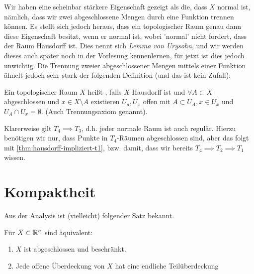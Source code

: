 \begin{remark*}
    Wir haben eine scheinbar stärkere Eigenschaft gezeigt als die, dass $X$ normal ist, nämlich, dass wir zwei abgeschlossene Mengen durch eine Funktion trennen können. Es stellt sich jedoch heraus, dass ein topologischer Raum genau dann diese Eigenschaft besitzt, wenn er normal ist, wobei 'normal' nicht fordert, dass der Raum Hausdorff ist. Dies nennt sich \textit{Lemma von Urysohn}, und wir werden dieses auch später noch in der Vorlesung kennenlernen, für jetzt ist dies jedoch unwichtig. Die Trennung zweier abgeschlossener Mengen mittels einer Funktion ähnelt jedoch sehr stark der folgenden Definition (und das ist kein Zufall):
\end{remark*}
\begin{definition}[Regulär]\label{def:regulär}
    Ein topologischer Raum $X$ heißt  , falls $X$ Hausdorff ist und  $\forall  A \subset X$ abgeschlossen und $x\in X \setminus A$ existieren $U_a, U_{x}$ offen mit $A\subset U_A, x\in U_x$ und $U_A \cap U_x = \emptyset$. (Auch Trennungsaxiom  genannt). \\
    \begin{minipage}{\textwidth}
        \centering
        \begin{minipage}{0.7\textwidth}
        \centering
        \end{minipage}
    \end{minipage}
\end{definition}

\begin{dremark}
    Klarerweise gilt $T_4 \implies T_3$, d.h. jeder normale Raum ist auch regulär. Hierzu benötigen wir nur, dass Punkte in $T_4$-Räumen abgeschlossen sind, aber das folgt mit \autoref{thm:hausdorff-impliziert-t1}, bzw. damit, dass wir bereits $T_4 \implies T_2 \implies T_1$ wissen.
\end{dremark}
\begin{figure}[ht]
    \centering
    \label{fig:regular-space}
\end{figure}


\section{Kompaktheit}
Aus der Analysis ist (vielleicht) folgender Satz bekannt.
\begin{theorem}\label{thm:heine-borel}
    Für $X\subset \mathbb{R}^n$ sind äquivalent:
    \begin{enumerate}[1)]
        \item $X$ ist abgeschlossen und beschränkt.
        \item Jede offene Überdeckung von $X$ hat eine endliche Teilüberdeckung
    \end{enumerate}
\end{theorem}

